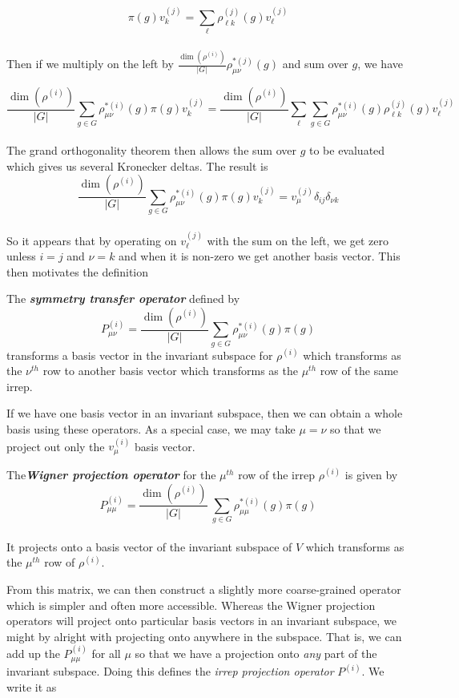 \documentclass[9 pt]{report}
\begin{document}
$$ \pi(g) v^{(j)}_k = \sum_{\ell}\rho^{(j)}_{\ell k}(g) v^{(j)}_\ell $$
\\
Then if we multiply on the left by $\frac{\dim(\rho^{(i)})}{|G|}\rho^{*(j)}_{\mu\nu}(g)$ and sum over $g$, we have

$$ \frac{\dim(\rho^{(i)})}{|G|}\sum_{g\in G}\rho^{*(i)}_{\mu\nu}(g)\pi(g) v^{(j)}_k = \frac{\dim(\rho^{(i)})}{|G|}\sum_\ell \sum_{g\in G}\rho^{*(i)}_{\mu\nu}(g)\rho^{(j)}_{\ell k}(g)v^{(j)}_\ell $$
\\
The grand orthogonality theorem then allows the sum over $g$ to be evaluated which gives us several Kronecker deltas. The result is
$$ \frac{\dim(\rho^{(i)})}{|G|}\sum_{g\in G}\rho^{*(i)}_{\mu\nu}(g)\pi(g)v^{(j)}_k = v^{(j)}_\mu \delta_{ij}\delta_{\nu k} $$
\\
So it appears that by operating on $v_\ell^{(j)}$ with the sum on the left, we get zero unless $i=j$ and $\nu=k$ and when it is non-zero we get another basis vector. This then motivates the definition

\begin{tcolorbox}
	The \textbf{\emph{symmetry transfer operator}} defined by 
	$$P^{(i)}_{\mu\nu} = \frac{\dim(\rho^{(i)})}{|G|}\sum_{g\in G}\rho^{*(i)}_{\mu\nu}(g)\pi(g) $$
	transforms a basis vector in the invariant subspace for $\rho^{(i)}$ which transforms as the $\nu^{th}$ row to another basis vector which transforms as the $\mu^{th}$ row of the same irrep.
\end{tcolorbox}

If we have one basis vector in an invariant subspace, then we can obtain a whole basis using these operators. As a special case, we may take $\mu=\nu$ so that we project out only the $v_\mu^{(i)}$ basis vector.

\begin{tcolorbox}
The\textbf{\emph{Wigner projection operator}} for the $\mu^{th}$ row of the irrep $\rho^{(i)}$ is given by
$$ P^{(i)}_{\mu\mu} = \frac{\dim(\rho^{(i)})}{|G|}\:\sum_{g\in G} \rho^{*(i)}_{\mu\mu}(g)\pi(g)  $$
\\
It projects onto a basis vector of the invariant subspace of $V$ which transforms as the $\mu^{th}$ row of $\rho^{(i)}$.
\end{tcolorbox}

From this matrix, we can then construct a slightly more coarse-grained operator which is simpler and often more accessible. Whereas the Wigner projection operators will project onto particular basis vectors in an invariant subspace, we might by alright with projecting onto anywhere in the subspace. That is, we can add up the $P^{(i)}_{\mu\mu}$ for all $\mu$ so that we have a projection onto \emph{any} part of the invariant subspace. Doing this defines the \emph{irrep projection operator} $P^{(i)}$. We write it as
\end{document}
